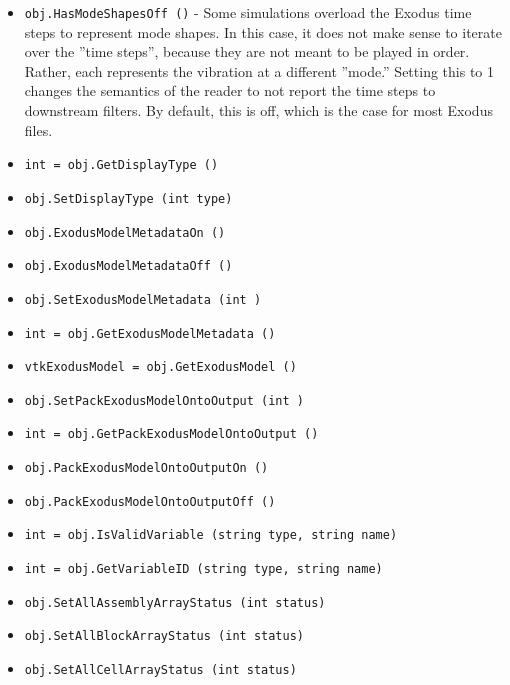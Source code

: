 \begin{itemize}
\item  \verb|obj.HasModeShapesOff ()| -  Some simulations overload the Exodus time steps to represent mode shapes.
 In this case, it does not make sense to iterate over the ''time steps'',
 because they are not meant to be played in order.  Rather, each represents
 the vibration at a different ''mode.''  Setting this to 1 changes the
 semantics of the reader to not report the time steps to downstream filters.
 By default, this is off, which is the case for most Exodus files.

\item  \verb|int = obj.GetDisplayType ()|

\item  \verb|obj.SetDisplayType (int type)|

\item  \verb|obj.ExodusModelMetadataOn ()|

\item  \verb|obj.ExodusModelMetadataOff ()|

\item  \verb|obj.SetExodusModelMetadata (int )|

\item  \verb|int = obj.GetExodusModelMetadata ()|

\item  \verb|vtkExodusModel = obj.GetExodusModel ()|

\item  \verb|obj.SetPackExodusModelOntoOutput (int )|

\item  \verb|int = obj.GetPackExodusModelOntoOutput ()|

\item  \verb|obj.PackExodusModelOntoOutputOn ()|

\item  \verb|obj.PackExodusModelOntoOutputOff ()|

\item  \verb|int = obj.IsValidVariable (string type, string name)|

\item  \verb|int = obj.GetVariableID (string type, string name)|

\item  \verb|obj.SetAllAssemblyArrayStatus (int status)|

\item  \verb|obj.SetAllBlockArrayStatus (int status)|

\item  \verb|obj.SetAllCellArrayStatus (int status)|


\end{itemize}

